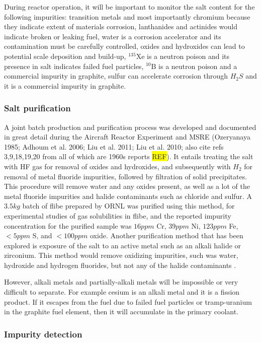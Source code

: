\documentclass[11pt]{article}
\newcommand{\iso}[2]{$^{#2}\mathrm{#1}$}
\newcommand{\REF}[0]{\colorbox{yellow}{REF}}
\begin{document}
During reactor operation, it will be important to monitor the salt content for the following impurities: transition metals and most importantly chromium because they indicate extent of materials corrosion, lanthanides and actinides would indicate broken or leaking fuel, water is a corrosion accelerator and its contamination must be carefully controlled, oxides and hydroxides can lead to potential scale deposition and build-up, \iso{Xe}{135} is a neutron poison and its presence in salt indicates failed fuel particles, \iso{B}{10} is a neutron poison and a commercial impurity in graphite, sulfur can accelerate corrosion through $H_2S$ and it is a commercial impurity in graphite.

\subsubsection{Salt purification}

A joint batch production and purification process was developed and documented in great detail during the Aircraft Reactor Experiment and MSRE (Ozeryanaya 1985; Adhoum et al. 2006; Liu et al. 2011; Liu et al. 2010; also cite refs 3,9,18,19,20 from \cite{williams2006acm} all of which are 1960s reports \REF).
It entails treating the salt with HF gas for removal of oxides and hydroxides, and subsequently with $H_2$ for removal of metal fluoride impurities, followed by filtration of solid precipitates.
This procedure will remove water and any oxides present, as well as a lot of the metal fluoride impurities and halide contaminants such as chloride and sulfur.
A $3.5kg$ batch of flibe prepared by ORNL was purified using this method, for experimental studies of gas solubilities in flibe, and the reported impurity concentration for the purified sample was $16ppm$ Cr, $39ppm$ Ni, $123ppm$ Fe, $<5ppm$ S, and $<100ppm$ oxide.
Another purification method that has been explored is exposure of the salt to an active metal such as an alkali halide or zirconium.
This method would remove oxidizing impurities, such was water, hydroxide and hydrogen fluorides, but not any of the halide contaminants \cite{williams2006acm}.

However, alkali metals and partially-alkali metals will be impossible or very difficult to separate.
For example cesium is an alkali metal and it is a fission product.
If it escapes from the fuel due to failed fuel particles or tramp-uranium in the graphite fuel element, then it will accumulate in the primary coolant.

\subsubsection{Impurity detection}
\end{document}
